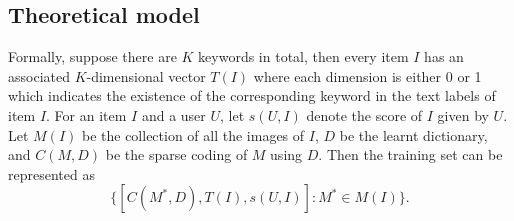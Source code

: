 \subsection{Theoretical model}
Formally, suppose there are $K$ keywords in total, then every item $I$ has an associated 
  $K$-dimensional vector $T(I)$ where each dimension is either 0 or 1 which indicates the 
  existence of the corresponding keyword in the text labels of item $I$.
For an item $I$ and a user $U$, let $s(U,I)$ denote the score of $I$ given by $U$. 
Let $M(I)$ be the collection of all the images of $I$, $D$ be the learnt dictionary, and
  $C(M,D)$ be the sparse coding of $M$ using $D$.
Then the training set can be represented as $$ \{ [C(M^*,D), T(I), s(U,I)] : M^* \in M(I) \} .$$
